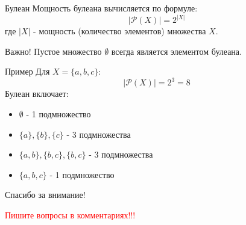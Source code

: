 \documentclass{beamer}
\newenvironment{rexample}[1][Пример]{\begin{exampleblock}{#1}}{\end{exampleblock}}
\begin{document}
\begin{frame}{Булеан}
    Мощность булеана вычисляется по формуле:
    \[ |\mathcal{P}(X)| = 2^{|X|} \]
    где $|X|$ - мощность (количество элементов) множества $X$.

    \alert{Важно! Пустое множество $\emptyset$ всегда является элементом булеана.}
\begin{rexample}    
        Для $X = \{a,b,c\}$:
        \[ |\mathcal{P}(X)| = 2^3 = 8 \]
        Булеан включает:
        \begin{itemize}
            \item $\emptyset$ - 1 подмножество
            \item $\{a\}, \{b\}, \{c\}$ - 3 подмножества
            \item $\{a,b\}, \{b,c\}, \{b,c\}$ - 3 подмножества 
            \item $\{a,b,c\}$ - 1 подмножество
        \end{itemize}
    \end{rexample}
\end{frame}
\begin{frame}{}
    \centering
    \Large Спасибо за внимание!
    
    \vspace{1cm}
    \small \textcolor{red}{Пишите вопросы в комментариях!!!}
\end{frame}
\end{document}
